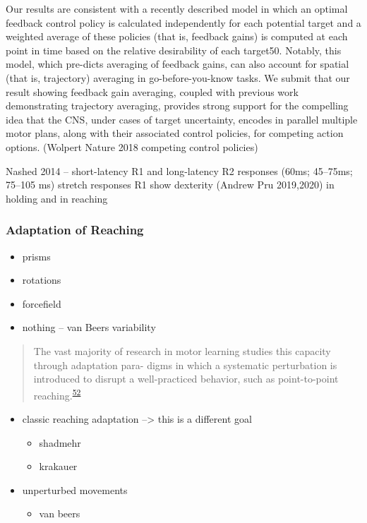\documentclass[
  a4paper,
]{article}
\providecommand{\tightlist}{%
  \setlength{\itemsep}{0pt}\setlength{\parskip}{0pt}}
\begin{document}
Our results are consistent with a recently described model in which an
optimal feedback control policy is calculated independently for each
potential target and a weighted average of these policies (that is,
feedback gains) is computed at each point in time based on the relative
desirability of each target50. Notably, this model, which pre-dicts
averaging of feedback gains, can also account for spatial (that is,
trajectory) averaging in go-before-you-know tasks. We submit that our
result showing feedback gain averaging, coupled with previous work
demonstrating trajectory averaging, provides strong support for the
compelling idea that the CNS, under cases of target uncertainty, encodes
in parallel multiple motor plans, along with their associated control
policies, for competing action options. (Wolpert Nature 2018 competing
control policies)

Nashed 2014 -- short-latency R1 and long-latency R2 responses (60ms;
45--75ms; 75--105 ms) stretch responses R1 show dexterity (Andrew Pru
2019,2020) in holding and in reaching

\hypertarget{adaptation-of-reaching}{%
\subsubsection{Adaptation of Reaching}\label{adaptation-of-reaching}}

\begin{itemize}
\tightlist
\item
  prisms
\item
  rotations
\item
  forcefield
\item
  nothing -- van Beers variability
\end{itemize}

\begin{quote}
The vast majority of research in motor learning studies this capacity
through adaptation para- digms in which a systematic perturbation is
introduced to disrupt a well-practiced behavior, such as point-to-point
reaching.\textsuperscript{\protect\hyperlink{ref-adrianTheoreticalModelsMotor2012}{52}}
\end{quote}

\begin{itemize}
\tightlist
\item
  classic reaching adaptation --\textgreater{} this is a different goal

  \begin{itemize}
  \tightlist
  \item
    shadmehr
  \item
    krakauer
  \end{itemize}
\item
  unperturbed movements

  \begin{itemize}
  \tightlist
  \item
    van beers
  \end{itemize}
\end{itemize}
\end{document}
